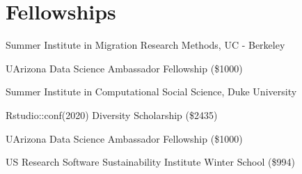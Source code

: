\section*{Fellowships}

Summer Institute in Migration Research Methods, UC - Berkeley

 UArizona Data Science Ambassador Fellowship (\$1000)

Summer Institute in Computational Social Science, Duke University

Rstudio::conf(2020) Diversity Scholarship (\$2435)

 UArizona Data Science Ambassador Fellowship (\$1000)

US Research Software Sustainability Institute Winter School (\$994)

\begin{comment}
2020 Louise Johnson Scholar in Medical Sociology 04-15-2020
2020 Howard B. Kaplan Memorial Award in Medical Sociology 04-15-2020
2020 Mini-Medical School for Social Scientists 3-16-20
2020 Demography, Economics, Psychology, and Epidemiology of Aging 3-16-20
2020 Data science for social good 1-31-20
    Interviewed on 2-24-2020 by Tom Davidson
    Final interview on 3-10-2020 by Elena Eneva 
    Denied: 3-25
2020 Networks & Health @ Duke 2-22-20
2020 carpentrycon-financial-aid 1-21-20 (cancelled due to covid)
2020 problem-solving sociology dissertation development workshop 1-15-20

2019 ICPSR Clogg Scholarship
2019 Digital Scholarship & Data Science Fellowship (UArizona)
2017 Irish Research Council Postgraduate Scholarship Scheme

\end{comment}